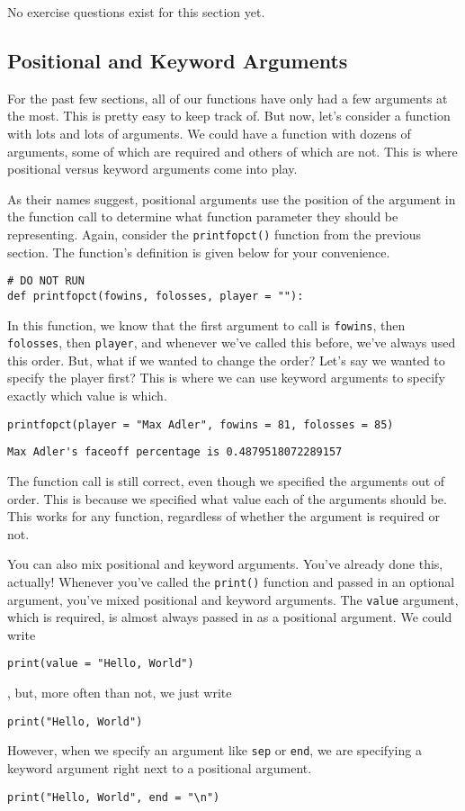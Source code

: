 No exercise questions exist for this section yet.
\subsection{Positional and Keyword Arguments}
For the past few sections, all of our functions have only had a few arguments at the most. This is pretty easy to keep track of. But now, let's consider a function with lots and lots of arguments. We could have a function with dozens of arguments, some of which are required and others of which are not. This is where positional versus keyword arguments come into play.\par
As their names suggest, positional arguments use the position of the argument in the function call to determine what function parameter they should be representing. Again, consider the \verb|printfopct()| function from the previous section. The function's definition is given below for your convenience.\par
\begin{lstlisting}[style=pippython]
# DO NOT RUN
def printfopct(fowins, folosses, player = ""):
\end{lstlisting}
In this function, we know that the first argument to call is \verb|fowins|, then \verb|folosses|, then \verb|player|, and whenever we've called this before, we've always used this order. But, what if we wanted to change the order? Let's say we wanted to specify the player first? This is where we can use keyword arguments to specify exactly which value is which.\par
\begin{lstlisting}[style=pippython]
printfopct(player = "Max Adler", fowins = 81, folosses = 85)
\end{lstlisting}
\begin{lstlisting}[style=none]
Max Adler's faceoff percentage is 0.4879518072289157
\end{lstlisting}
The function call is still correct, even though we specified the arguments out of order. This is because we specified what value each of the arguments should be. This works for any function, regardless of whether the argument is required or not.\par
You can also mix positional and keyword arguments. You've already done this, actually! Whenever you've called the \verb|print()| function and passed in an optional argument, you've mixed positional and keyword arguments. The \verb|value| argument, which is required, is almost always passed in as a positional argument. We could write
\begin{lstlisting}[style=pippython]
print(value = "Hello, World")
\end{lstlisting}
, but, more often than not, we just write
\begin{lstlisting}[style=pippython]
print("Hello, World")
\end{lstlisting}
However, when we specify an argument like \verb|sep| or \verb|end|, we are specifying a keyword argument right next to a positional argument.\par
\begin{lstlisting}[style=pippython]
print("Hello, World", end = "\n")
\end{lstlisting}
